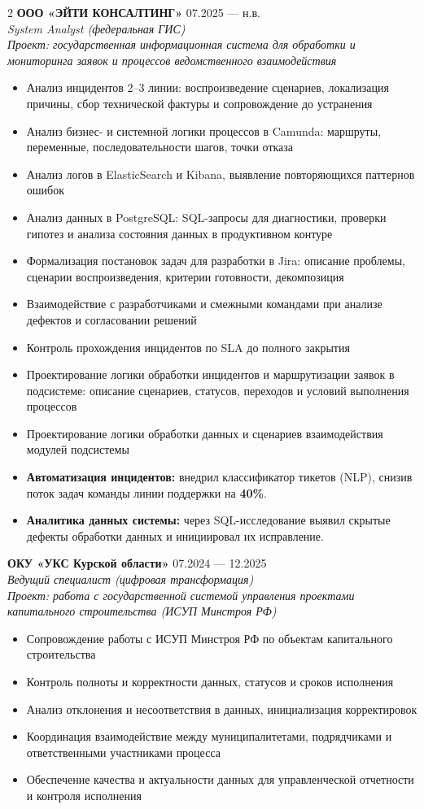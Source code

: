 \documentclass[9pt,a4paper]{article}
\begin{document}
\begin{paracol}{2}
\textbf{ООО «ЭЙТИ КОНСАЛТИНГ»} \hfill 07.2025 --- н.в.\\
\textit{System Analyst (федеральная ГИС)}\\
\textit{Проект: государственная информационная система для обработки и мониторинга заявок и процессов ведомственного взаимодействия}
\begin{itemize}
  \item Анализ инцидентов 2--3 линии: воспроизведение сценариев, локализация причины, сбор технической фактуры и сопровождение до устранения
\item Анализ бизнес- и системной логики процессов в Camunda: маршруты, переменные, последовательности шагов, точки отказа
\item Анализ логов в ElasticSearch и Kibana, выявление повторяющихся паттернов ошибок
\item Анализ данных в PostgreSQL: SQL-запросы для диагностики, проверки гипотез и анализа состояния данных в продуктивном контуре
\item Формализация постановок задач для разработки в Jira: описание проблемы, сценарии воспроизведения, критерии готовности, декомпозиция
\item Взаимодействие с разработчиками и смежными командами при анализе дефектов и согласовании решений
  \item Контроль прохождения инцидентов по SLA до полного закрытия
  \item Проектирование логики обработки инцидентов и маршрутизации заявок в подсистеме: описание сценариев, статусов, переходов и условий выполнения процессов
  \item Проектирование логики обработки данных и сценариев взаимодействия модулей подсистемы
  \item \textbf{Автоматизация инцидентов:}
внедрил классификатор тикетов (NLP), снизив поток задач команды линии поддержки на \textbf{40\%}.
\item \textbf{Аналитика данных системы:}
через SQL-исследование выявил скрытые дефекты обработки данных и инициировал их исправление.
\end{itemize}

\textbf{ОКУ «УКС Курской области»} \hfill 07.2024 --- 12.2025\\
\textit{Ведущий специалист (цифровая трансформация)}\\
\textit{Проект: работа с государственной системой управления проектами капитального строительства (ИСУП Минстроя РФ)}
\begin{itemize}
  \item Сопровождение работы с ИСУП Минстроя РФ по объектам капитального строительства
  \item Контроль полноты и корректности данных, статусов и сроков исполнения
  \item Анализ отклонения и несоответствия в данных, инициализация корректировок
  \item Координация взаимодействие между муниципалитетами, подрядчиками и ответственными участниками процесса
  \item Обеспечение качества и актуальности данных для управленческой отчетности и контроля исполнения
\end{itemize}


\end{paracol}
\end{document}
